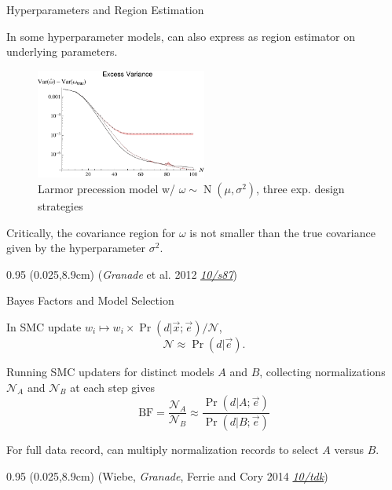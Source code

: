 \documentclass[xcolor=dvipsnames, compress]{beamer}
\renewcommand\UrlFont{\color{red}\rmfamily\itshape}
\newcommand{\shortdoi}[1]{\href{http://doi.org/#1}{\UrlFont 10/#1}}
\newcommand{\N}{\operatorname{N}}
\newcommand{\bottomnote}[1]{
  \begin{textblock*}{0.95\paperwidth} (0.025\paperwidth,8.9cm)
    {\tiny \hfill #1}
  \end{textblock*}
}
\begin{document}
\begin{frame}{Hyperparameters and Region Estimation}

  In some hyperparameter models, can also express as region
  estimator on underlying parameters.

  \begin{figure}
    \centering
    \includegraphics[width=0.5\textwidth]{hypernormal-excess-cov}
    \caption{Larmor precession model w/ $\omega\sim\N(\mu, \sigma^2)$, three exp. design strategies}
  \end{figure}

  Critically, the covariance region for $\omega$ is not smaller
  than the true covariance given by the hyperparameter $\sigma^2$.

  \bottomnote{(\emph{Granade} et al. 2012 \shortdoi{s87})}

\end{frame}

\begin{frame}{Bayes Factors and Model Selection}

  In SMC update $w_i \mapsto w_i \times \Pr(d | \vec{x}; \vec{e}) / \mathcal{N}$,
  $$
    \mathcal{N} \approx \Pr(d | \vec{e}).
  $$

  Running SMC updaters for distinct models $A$ and $B$, collecting normalizations
  $\mathcal{N}_A$ and $\mathcal{N}_B$ at each step gives
  $$
    \text{BF} = \frac{\mathcal{N}_A}{\mathcal{N}_B} \approx \frac{\Pr(d | A; \vec{e})}{\Pr(d | B; \vec{e})}
  $$

  For full data record, can multiply normalization records to select $A$ versus $B$.

  \bottomnote{(Wiebe, \emph{Granade}, Ferrie and Cory 2014 \shortdoi{tdk})}

\end{frame}
\end{document}
